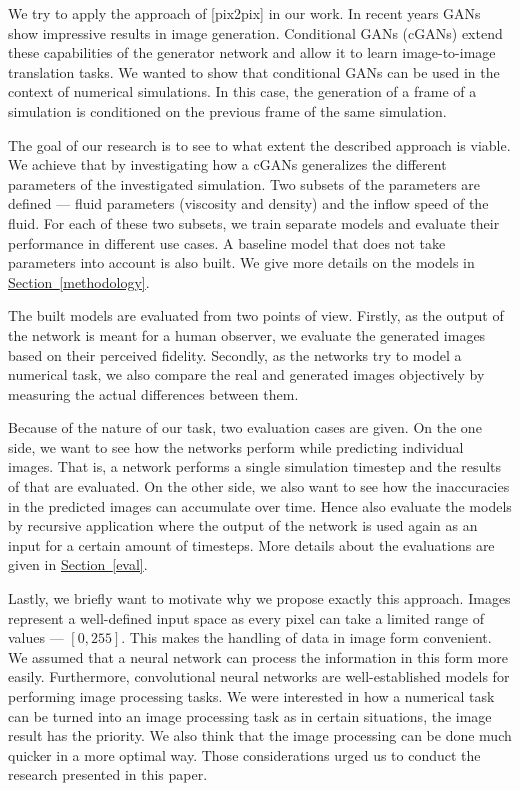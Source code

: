 \documentclass{llncs}
\newcommand{\refsec}[1]{\hyperref[#1]{Section~\ref*{#1}}}
\begin{document}
We try to apply the approach of [pix2pix] in our work. In recent years GANs show impressive results in image generation. Conditional GANs (cGANs) extend these capabilities of the generator network and allow it to learn image-to-image translation tasks. We wanted to show that conditional GANs can be used in the context of numerical simulations. In this case, the generation of a frame of a simulation is conditioned on the previous frame of the same simulation.

The goal of our research is to see to what extent the described approach is viable. We achieve that by investigating how a cGANs generalizes the different parameters of the investigated simulation. Two subsets of the parameters are defined --- fluid parameters (viscosity and density) and the inflow speed of the fluid. For each of these two subsets, we train separate models and evaluate their performance in different use cases. A baseline model that does not take parameters into account is also built. We give more details on the models in \refsec{methodology}.

The built models are evaluated from two points of view. Firstly, as the output of the network is meant for a human observer, we evaluate the generated images based on their perceived fidelity. Secondly, as the networks try to model a numerical task, we also compare the real and generated images objectively by measuring the actual differences between them.

Because of the nature of our task, two evaluation cases are given. On the one side, we want to see how the networks perform while predicting individual images. That is, a network performs a single simulation timestep and the results of that are evaluated. On the other side, we also want to see how the inaccuracies in the predicted images can accumulate over time. Hence also evaluate the models by recursive application where the output of the network is used again as an input for a certain amount of timesteps. More details about the evaluations are given in \refsec{eval}.

Lastly, we briefly want to motivate why we propose exactly this approach. Images represent a well-defined input space as every pixel can take a limited range of values --- $[0, 255]$. This makes the handling of data in image form convenient. We assumed that a neural network can process the information in this form more easily. Furthermore, convolutional neural networks are well-established models for performing image processing tasks. We were interested in how a numerical task can be turned into an image processing task as in certain situations, the image result has the priority. We also think that the image processing can be done much quicker in a more optimal way. Those considerations urged us to conduct the research presented in this paper.
\end{document}
